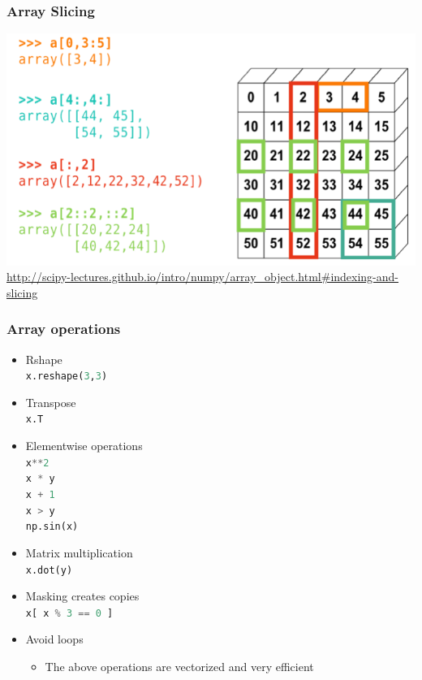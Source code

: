 \documentclass[xcolor=table,10pt,final]{beamer}
\begin{document}
\begin{frame}
  \frametitle{Array Slicing}
  \includegraphics[width=.8\textwidth]{figures/slices}\\
  {\scriptsize \url{http://scipy-lectures.github.io/intro/numpy/array\_object.html\#indexing-and-slicing}}
\end{frame}

\begin{frame}[fragile]
  \frametitle{Array operations}
  \begin{itemize}
    \item Rshape\\
      \lstinline[language=python]|x.reshape(3,3)|
    \item Transpose\\
      \lstinline[language=python]|x.T|
    \item Elementwise operations\\
      \lstinline[language=python]|x**2|\\
      \lstinline[language=python]|x * y|\\
      \lstinline[language=python]|x + 1|\\
      \lstinline[language=python]|x > y|\\
      \lstinline[language=python]|np.sin(x)|
    \item Matrix multiplication\\
      \lstinline[language=python]|x.dot(y)|
    \item Masking creates copies\\
      \lstinline[language=python]|x[ x % 3 == 0 ]|\\
    \item Avoid loops
      \begin{itemize}
        \item The above operations are vectorized and very efficient
      \end{itemize}
  \end{itemize}
\end{frame}
\end{document}
